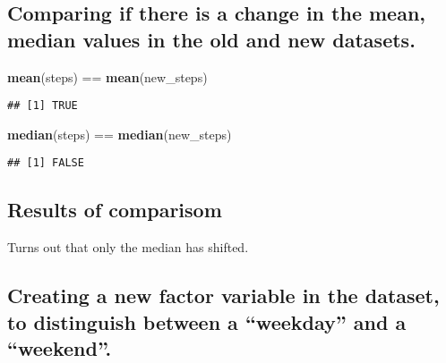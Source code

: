 \documentclass[]{article}
\newenvironment{Shaded}{\begin{snugshade}}{\end{snugshade}}
\newcommand{\KeywordTok}[1]{\textcolor[rgb]{0.13,0.29,0.53}{\textbf{{#1}}}}
\newcommand{\StringTok}[1]{\textcolor[rgb]{0.31,0.60,0.02}{{#1}}}
\newcommand{\NormalTok}[1]{{#1}}
\begin{document}
\subsection{Comparing if there is a change in the mean, median values in
the old and new
datasets.}\label{comparing-if-there-is-a-change-in-the-mean-median-values-in-the-old-and-new-datasets.}

\begin{Shaded}
\begin{Highlighting}[]
\KeywordTok{mean}\NormalTok{(steps) ==}\StringTok{ }\KeywordTok{mean}\NormalTok{(new_steps)}
\end{Highlighting}
\end{Shaded}

\begin{verbatim}
## [1] TRUE
\end{verbatim}

\begin{Shaded}
\begin{Highlighting}[]
\KeywordTok{median}\NormalTok{(steps) ==}\StringTok{ }\KeywordTok{median}\NormalTok{(new_steps)}
\end{Highlighting}
\end{Shaded}

\begin{verbatim}
## [1] FALSE
\end{verbatim}

\subsection{Results of comparisom}\label{results-of-comparisom}

Turns out that only the median has shifted.

\subsection{Creating a new factor variable in the dataset, to
distinguish between a ``weekday'' and a
``weekend''.}\label{creating-a-new-factor-variable-in-the-dataset-to-distinguish-between-a-weekday-and-a-weekend.}

\begin{Shaded}
\end{Shaded}
\end{document}
